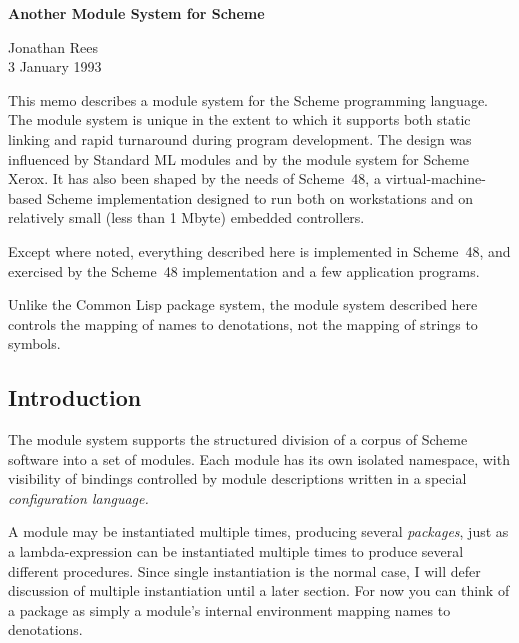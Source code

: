 



\newcommand{\goesto}{\hbox{$\longrightarrow$}}
\newcommand{\alt}{$\vert$}
\newcommand{\arbno}[1]{{{#1}$^*$}}
\newcommand{\hack}{Scheme~48}



\begin{center}
{\Large\bf Another Module System for Scheme}

\vspace{2ex}
Jonathan Rees \\
3 January 1993
\end{center}

\vspace{3ex}

This memo describes a module system for the Scheme programming
language.  The module system is unique in the extent to which it
supports both static linking and rapid turnaround during program
development.  The design was influenced by Standard ML
modules\cite{MacQueen:Modules} and by the module system for Scheme
Xerox\cite{Curtis-Rauen:Modules}.  It has also been shaped by the
needs of \hack{}, a virtual-machine-based Scheme implementation
designed to run both on workstations and on relatively small (less
than 1 Mbyte) embedded controllers.

Except where noted, everything described here is implemented in
\hack{}, and exercised by the \hack{} implementation and a few
application programs.

Unlike the Common Lisp package system, the module system described
here controls the mapping of names to denotations, not the
mapping of strings to symbols.


\subsection*{Introduction}

The module system supports the structured division of a corpus of
Scheme software into a set of modules.  Each module has its own
isolated namespace, with visibility of bindings controlled by module
descriptions written in a special {\em configuration language.}

A module may be instantiated multiple times, producing several {\em
packages}, just as a lambda-expression can be instantiated multiple
times to produce several different procedures.  Since single
instantiation is the normal case, I will defer discussion of multiple
instantiation until a later section.  For now you can think of a
package as simply a module's internal environment mapping names to
denotations.


